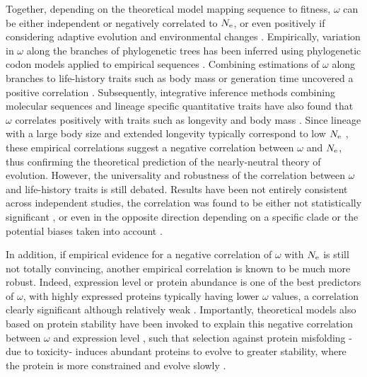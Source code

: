 \documentclass{MBE}%
\begin{document}
Together, depending on the theoretical model mapping sequence to fitness, $\omega$ can be either independent or negatively correlated to $N_{\mathrm{e}}$, or even positively if considering adaptive evolution and environmental changes \citep{Lanfear2014}.
Empirically, variation in $\omega$ along the branches of phylogenetic trees has been inferred using phylogenetic codon models applied to empirical sequences \citep{Yang2001, Zhang2004}. 
Combining estimations of $\omega$ along branches to life-history traits such as body mass or generation time uncovered a positive correlation \citep{Popadin2007, Nikolaev2007}.
Subsequently, integrative inference methods combining molecular sequences and lineage specific quantitative traits have also found that $\omega$ correlates positively with traits such as longevity and body mass \citep{Lartillot2011, Figuet2017}.
Since lineage with a large body size and extended longevity typically correspond to low $N_{\mathrm{e}}$ \citep{Romiguier2014}, these empirical correlations suggest a negative correlation between $\omega$ and $N_{\mathrm{e}}$, thus confirming the theoretical prediction of the nearly-neutral theory of evolution.
However, the universality and robustness of the correlation between $\omega$ and life-history traits is still debated. 
Results have been not entirely consistent across independent studies, the correlation was found to be either not statistically significant \citep{Lartillot2012}, or even in the opposite direction depending on a specific clade or the potential biases taken into account \citep{Lanfear2010, Nabholz2013, Lanfear2014, Figuet2016}.

In addition, if empirical evidence for a negative correlation of $\omega$ with $N_{\mathrm{e}}$ is still not totally convincing, another empirical correlation is known to be much more robust.
Indeed, expression level or protein abundance is one of the best predictors of $\omega$, with highly expressed proteins typically having lower $\omega$ values, a correlation clearly significant although relatively weak \citep{Duret2000, Rocha2004, Drummond2005a, Zhang2015, Song2017}.
Importantly, theoretical models also based on protein stability have been invoked to explain this negative correlation between $\omega$ and expression level \citep{Wilke2006, Drummond2008}, such that selection against protein misfolding -due to toxicity- induces abundant proteins to evolve to greater stability, where the protein is more constrained and evolve slowly \citep{Serohijos2012}.
\end{document}
